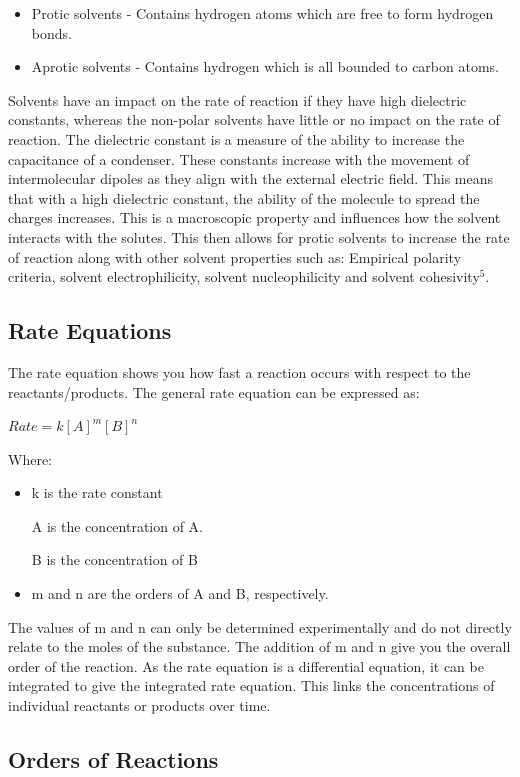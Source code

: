 \begin{itemize}
\item Protic solvents - Contains hydrogen atoms which are free to form hydrogen bonds.
\item Aprotic solvents - Contains hydrogen which is all bounded to carbon atoms.
\end{itemize}

Solvents have an impact on the  rate of reaction if they have high dielectric constants, whereas the non-polar solvents have little or no impact on the rate of reaction. The dielectric constant is a measure of the ability to increase the capacitance of a condenser. These constants increase with the movement of intermolecular dipoles as they align with the external electric field. This means that with a high dielectric constant, the ability of the molecule to spread the charges increases. This is a macroscopic property and influences how the solvent interacts with the solutes. This then allows for protic solvents to increase the rate of reaction along with other solvent properties such as: Empirical polarity criteria, solvent electrophilicity, solvent nucleophilicity and solvent cohesivity$^5$.

	\subsection{Rate Equations}

The rate equation shows you how fast a reaction occurs with respect to the reactants/products. The general rate equation can be expressed as:

$Rate = k[A]^m [B]^n$

Where:
\begin{itemize}
\item k is the rate constant
\item [A] is the concentration of A.
\item [B] is the concentration of B
\item m and n are the orders of A and B, respectively.
\end{itemize}
The values of m and n can only be determined experimentally and do not directly relate to the moles of the substance. The addition of m and n give you the overall order of the reaction. As the rate equation is a differential equation, it can be integrated to give the integrated rate equation. This links the concentrations of individual reactants or products over time.


	\subsection{Orders of Reactions}


